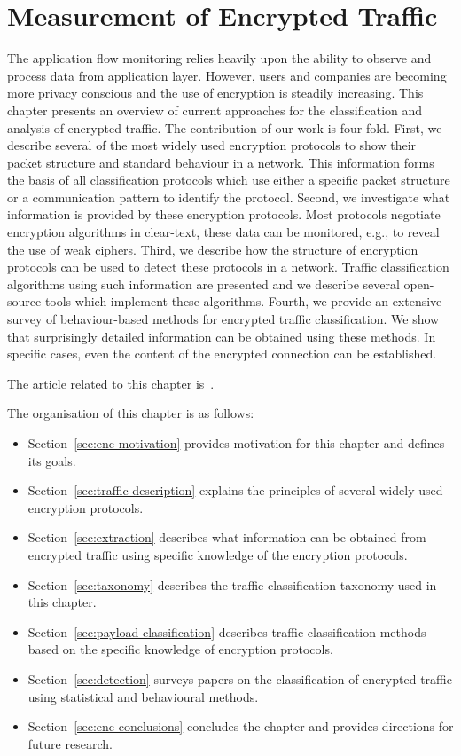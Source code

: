 \chapter{Measurement of Encrypted Traffic} \label{chap:measurement-of-encrypted-traffic}

\begin{chapintro}

The application flow monitoring relies heavily upon the ability to observe and process data from application layer. However, users and companies are becoming more privacy conscious and the use of encryption is steadily increasing. This chapter presents an overview of current approaches for the classification and analysis of encrypted traffic. The contribution of our work is four-fold. First, we describe several of the most widely used encryption protocols to show their packet structure and standard behaviour in a network. This information forms the basis of all classification protocols which use either a specific packet structure or a communication pattern to identify the protocol. Second, we investigate what information is provided by these encryption protocols. Most protocols negotiate encryption algorithms in clear-text, these data can be monitored, e.g., to reveal the use of weak ciphers. Third, we describe how the structure of encryption protocols can be used to detect these protocols in a network. Traffic classification algorithms using such information are presented and we describe several open-source tools which implement these algorithms. Fourth, we provide an extensive survey of behaviour-based methods for encrypted traffic classification. We show that surprisingly detailed information can be obtained using these methods. In specific cases, even the content of the encrypted connection can be established.

The article related to this chapter is~\cite{Velan-2015-Survey}.

The organisation of this chapter is as follows:
\begin{itemize}
  \item Section~\ref{sec:enc-motivation} provides motivation for this chapter and defines its goals.
  \item Section~\ref{sec:traffic-description} explains the principles of several widely used encryption protocols.
  \item Section~\ref{sec:extraction} describes what information can be obtained from encrypted traffic using specific knowledge of the encryption protocols.
  \item Section~\ref{sec:taxonomy} describes the traffic classification taxonomy used in this chapter.
  \item Section~\ref{sec:payload-classification} describes traffic classification methods based on the specific knowledge of encryption protocols.
  \item Section~\ref{sec:detection} surveys papers on the classification of encrypted traffic using statistical and behavioural methods.
  \item Section~\ref{sec:enc-conclusions} concludes the chapter and provides directions for future research.
\end{itemize}


\end{chapintro}
